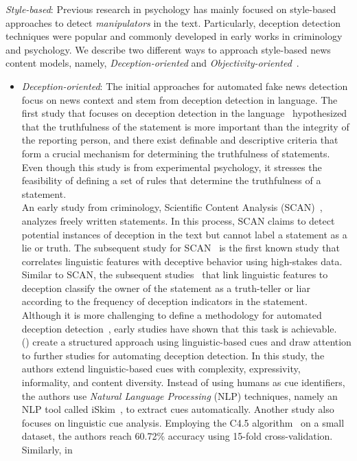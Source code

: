 \begin{description}
    \item{\emph{Style-based}:} Previous research in psychology has mainly focused on style-based approaches to detect \emph{manipulators} in the text. Particularly, deception detection techniques were popular and commonly developed in early works in criminology and psychology. We describe two different ways to approach style-based news content models, namely, \emph{Deception-oriented} and \emph{Objectivity-oriented}~\parencite{FakeNewsDetectionOnSocialMediaADataMiningPerspective_Shu}.
    \begin{itemize}
        \item \emph{Deception-oriented}: The initial approaches for automated fake news detection focus on news context and stem from deception detection in language. The first study that focuses on deception detection in the language~\parencite{DieEntwicklungDerGerichtspsychologischen_Undeutsch} hypothesized that the truthfulness of the statement is more important than the integrity of the reporting person, and there exist definable and descriptive criteria that form a crucial mechanism for determining the truthfulness of statements. Even though this study is from experimental psychology, it stresses the feasibility of defining a set of rules that determine the truthfulness of a statement.\\ An early study from criminology, Scientific Content Analysis (SCAN)~\parencite{SCAN_Sapir1987}, analyzes freely written statements.  In this process, SCAN claims to detect potential instances of deception in the text but cannot label a statement as a lie or truth. The subsequent study for SCAN~\parencite{SCAN_Smith2001} is the first known study that correlates linguistic features with deceptive behavior using high-stakes data. Similar to SCAN, the subsequent studies~\parencite{CommunicationUnderStress_Adams, LyingWords_Newman} that link linguistic features to deception classify the owner of the statement as a truth-teller or liar according to the frequency of deception indicators in the statement.\\Although it is more challenging to define a methodology for automated deception detection~\parencite{TheAccuracyConfidenceRelation_DePaulo}, early studies have shown that this task is achievable. ~\citeauthor{AutomatingLinguisticsBasedCues_Zhou} (\citeyear{AutomatingLinguisticsBasedCues_Zhou}) create a structured approach using linguistic-based cues and draw attention to further studies for automating deception detection. In this study, the authors extend linguistic-based cues with complexity, expressivity, informality, and content diversity. Instead of using humans as cue identifiers, the authors use \emph{Natural Language Processing} (NLP) techniques, namely an NLP tool called iSkim~\parencite{iSkim_Zhou}, to extract cues automatically. Another study also focuses on linguistic cue analysis. Employing the C4.5 algorithm~\parencite{C45_Salzberg} on a small dataset, the authors reach 60.72\% accuracy using 15-fold cross-validation.\\Similarly, in~\citeauthor{VerificatoinAndImplementationofLBDeceptionIndicators_Bachenko} 
\end{itemize}
\end{description}
